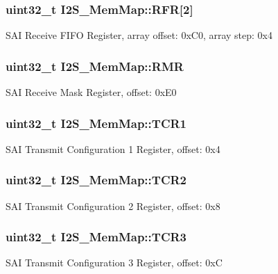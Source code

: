 \subsubsection[{R\+F\+R}]{\setlength{\rightskip}{0pt plus 5cm}uint32\+\_\+t I2\+S\+\_\+\+Mem\+Map\+::\+R\+F\+R\mbox{[}2\mbox{]}}\label{struct_i2_s___mem_map_ac7142d72a5d91e4b1b086c037d514559}
S\+A\+I Receive F\+I\+F\+O Register, array offset\+: 0x\+C0, array step\+: 0x4 \hypertarget{struct_i2_s___mem_map_af8727047a9c7ea717dcfb8f94061b6a3}{}
\subsubsection[{R\+M\+R}]{\setlength{\rightskip}{0pt plus 5cm}uint32\+\_\+t I2\+S\+\_\+\+Mem\+Map\+::\+R\+M\+R}\label{struct_i2_s___mem_map_af8727047a9c7ea717dcfb8f94061b6a3}
S\+A\+I Receive Mask Register, offset\+: 0x\+E0 \hypertarget{struct_i2_s___mem_map_a1e90b98887869de05cc981b80e2f50b4}{}
\subsubsection[{T\+C\+R1}]{\setlength{\rightskip}{0pt plus 5cm}uint32\+\_\+t I2\+S\+\_\+\+Mem\+Map\+::\+T\+C\+R1}\label{struct_i2_s___mem_map_a1e90b98887869de05cc981b80e2f50b4}
S\+A\+I Transmit Configuration 1 Register, offset\+: 0x4 \hypertarget{struct_i2_s___mem_map_aa3e215825b6d333e5ee6ef35541b0474}{}
\subsubsection[{T\+C\+R2}]{\setlength{\rightskip}{0pt plus 5cm}uint32\+\_\+t I2\+S\+\_\+\+Mem\+Map\+::\+T\+C\+R2}\label{struct_i2_s___mem_map_aa3e215825b6d333e5ee6ef35541b0474}
S\+A\+I Transmit Configuration 2 Register, offset\+: 0x8 \hypertarget{struct_i2_s___mem_map_a98ceb21993839e209a3634870391b6a7}{}
\subsubsection[{T\+C\+R3}]{\setlength{\rightskip}{0pt plus 5cm}uint32\+\_\+t I2\+S\+\_\+\+Mem\+Map\+::\+T\+C\+R3}\label{struct_i2_s___mem_map_a98ceb21993839e209a3634870391b6a7}
S\+A\+I Transmit Configuration 3 Register, offset\+: 0x\+C \hypertarget{struct_i2_s___mem_map_a933a94f14922497e04bd3178585e6288}{}
